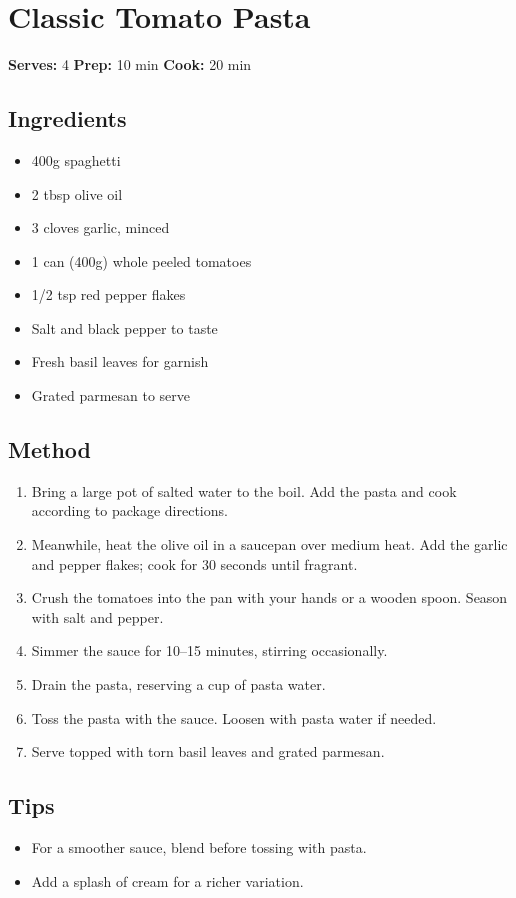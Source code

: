 \documentclass{article}
\begin{document}
\section*{Classic Tomato Pasta}

\textbf{Serves:} 4 \hfill \textbf{Prep:} 10 min \hfill \textbf{Cook:} 20 min

\subsection*{Ingredients}
\begin{itemize}[noitemsep]
  \item 400g spaghetti
  \item 2 tbsp olive oil
  \item 3 cloves garlic, minced
  \item 1 can (400g) whole peeled tomatoes
  \item 1/2 tsp red pepper flakes
  \item Salt and black pepper to taste
  \item Fresh basil leaves for garnish
  \item Grated parmesan to serve
\end{itemize}

\subsection*{Method}
\begin{enumerate}
  \item Bring a large pot of salted water to the boil. Add the pasta and cook according to package directions.
  \item Meanwhile, heat the olive oil in a saucepan over medium heat. Add the garlic and pepper flakes; cook for 30 seconds until fragrant.
  \item Crush the tomatoes into the pan with your hands or a wooden spoon. Season with salt and pepper.
  \item Simmer the sauce for 10--15 minutes, stirring occasionally.
  \item Drain the pasta, reserving a cup of pasta water.
  \item Toss the pasta with the sauce. Loosen with pasta water if needed.
  \item Serve topped with torn basil leaves and grated parmesan.
\end{enumerate}

\subsection*{Tips}
\begin{itemize}[noitemsep]
  \item For a smoother sauce, blend before tossing with pasta.
  \item Add a splash of cream for a richer variation.
\end{itemize}
\end{document}

